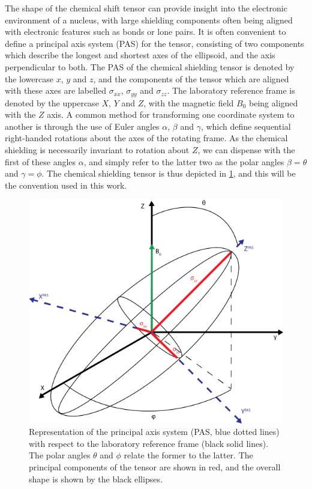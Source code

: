 \begin{refsection}
The shape of the chemical shift tensor can provide insight into the electronic environment of a nucleus, with large shielding components often being aligned with electronic features such as bonds or lone pairs.
It is often convenient to define a principal axis system (PAS) for the tensor, consisting of two components which describe the longest and shortest axes of the ellipsoid, and the axis perpendicular to both.
The PAS of the chemical shielding tensor is denoted by the lowercase $ x $, $ y $ and $ z $, and the components of the tensor which are aligned with these axes are labelled $ \sigma_{xx} $, $ \sigma_{yy} $ and $ \sigma_{zz} $.
The laboratory reference frame is denoted by the uppercase $ X $, $ Y $ and $ Z $, with the magnetic field $ B_0 $ being aligned with the $ Z $ axis.
A common method for transforming one coordinate system to another is through the use of Euler angles $ \alpha $, $ \beta $ and $ \gamma $, which define sequential right-handed rotations about the axes of the rotating frame.
As the chemical shielding is necessarily invariant to rotation about $ Z $, we can dispense with the first of these angles $ \alpha $, and simply refer to the latter two as the polar angles $ \beta = \theta $ and $ \gamma = \phi $.
The chemical shielding tensor is thus depicted in \cref{fig:chemical-shielding-tensor}, and this will be the convention used in this work.

\begin{figure}
  \centering
  \includegraphics[width=0.4\linewidth]{Figures/Chemical_Shift_Tensor.png}
  \caption[Principal axis system with respect to laboratory reference.]{Representation of the principal axis system (PAS, blue dotted lines) with respect to the laboratory reference frame (black solid lines). The polar angles $ \theta $ and $ \phi $ relate the former to the latter. The principal components of the tensor are shown in red, and the overall shape is shown by the black ellipses.}\label{fig:chemical-shielding-tensor}
\end{figure}


\end{refsection}
